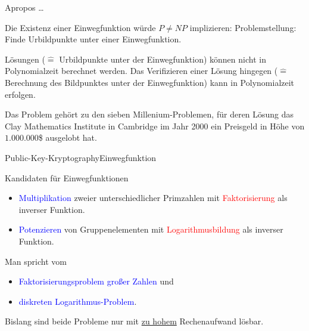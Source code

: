 \documentclass{beamer}
\newcommand{\tb}[1]{{\textcolor{blue}{#1}}}
\newcommand{\tred}[1]{{\textcolor{red}{#1}}}
\theoremstyle{plain}
\begin{document}
\begin{frame}{Apropos \dots}{~}

\begin{exampleblock}{Die Existenz einer Einwegfunktion würde $P \neq NP$ implizieren:}
Problemstellung: Finde Urbildpunkte unter einer Einwegfunktion.
\vspace{0.5cm}

 Lösungen ($\hat =$ Urbildpunkte unter der Einwegfunktion) können nicht in Polynomialzeit berechnet werden. Das Verifizieren einer Lösung hingegen ($\hat =$ Berechnung des Bildpunktes unter der Einwegfunktion) kann in Polynomialzeit erfolgen.
 \end{exampleblock}
 \pause
 \vspace{0.5cm}
 Das Problem gehört zu den sieben Millenium-Problemen, für deren Lösung das Clay Mathematics Institute in Cambridge im Jahr 2000 ein Preisgeld in Höhe von $1.000.000$\$ ausgelobt hat. 
\end{frame}

\begin{frame}{Public-Key-Kryptography}{Einwegfunktion}
 
 \begin{block}{Kandidaten für Einwegfunktionen}
  \begin{itemize}
   \item \tb{Multiplikation} zweier unterschiedlicher Primzahlen mit \tred{Faktorisierung} als inverser Funktion.
   \item \tb{Potenzieren} von Gruppenelementen mit \tred{Logarithmusbildung} als inverser Funktion.
  \end{itemize}
   \end{block}
  \pause
  
  \vspace{0.5cm}
  
  Man spricht vom 
  \begin{itemize}
   \item \tb{Faktorisierungsproblem großer Zahlen} und
   \item \tb{diskreten Logarithmus-Problem}.
  \end{itemize}

  Bislang sind beide Probleme nur mit \underline{zu hohem} Rechenaufwand lösbar.

\end{frame}
\end{document}
